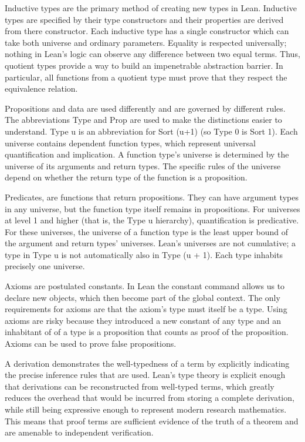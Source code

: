 \documentclass{article}
\newcommand{\1}{\mathbbm{1}}
\theoremstyle{plain}
\theoremstyle{definition}
\numberwithin{equation}{section}
\begin{document}
Inductive types are the primary method of creating new types in Lean. Inductive types are specified by their type constructors and their properties are derived from there constructor. Each inductive type has a single constructor which can take both universe and ordinary parameters. Equality is respected universally; nothing in Lean's logic can observe any difference between two equal terms. Thus, quotient types provide a way to build an impenetrable abstraction barrier. In particular, all functions from a quotient type must prove that they respect the equivalence relation.

Propositions and data are used differently and are governed by different rules. The abbreviations Type and Prop are used to make the distinctions easier to understand. Type u is an abbreviation for Sort (u+1) (so Type 0 is Sort 1). Each universe contains dependent function types, which represent universal quantification and implication. A function type’s universe is determined by the universe of its arguments and return types. The specific rules of the universe depend on whether the return type of the function is a proposition. 

Predicates, are functions that return propositions. They can have argument types in any universe, but the function type itself remains in propositions. For universes at level 1 and higher (that is, the Type u hierarchy), quantification is predicative. For these universes, the universe of a function type is the least upper bound of the argument and return types' universes. Lean's universes are not cumulative; a type in Type u is not automatically also in Type (u + 1). Each type inhabits precisely one universe.

Axioms are postulated constants. In Lean the constant command allows us to declare new objects, which then become part of the global context. The only requirements for axioms are that the axiom’s type must itself be a type. Using axioms are risky because they introduced a new constant of any type and an inhabitant of of a type is a proposition that counts as proof of the proposition. Axioms can be used to prove false propositions. 

A derivation demonstrates the well-typedness of a term by explicitly indicating the precise inference rules that are used. Lean's type theory is explicit enough that derivations can be reconstructed from well-typed terms, which greatly reduces the overhead that would be incurred from storing a complete derivation, while still being expressive enough to represent modern research mathematics. This means that proof terms are sufficient evidence of the truth of a theorem and are amenable to independent verification.
\end{document}
